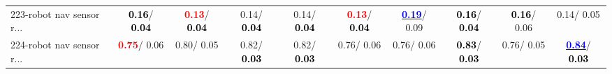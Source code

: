 \begin{table}[h]
\begin{center}
{\begin{tabular}{lc|c|c|c|c|c|c|c|c}
223-robot nav sensor r... & \textcolor{black}{\textbf{  0.16}}/\textcolor{black}{\textbf{  0.04}} & \textcolor{red}{\textbf{  0.13}}/\textcolor{black}{\textbf{  0.04}} &   0.14/\textcolor{black}{\textbf{  0.04}} &   0.14/\textcolor{black}{\textbf{  0.04}} & \textcolor{red}{\textbf{  0.13}}/\textcolor{black}{\textbf{  0.04}} & \underline{\textcolor{blue}{\textbf{  0.19}}}/  0.09 & \textcolor{black}{\textbf{  0.16}}/\textcolor{black}{\textbf{  0.04}} & \textcolor{black}{\textbf{  0.16}}/  0.06 &   0.14/  0.05 \\
224-robot nav sensor r... & \textcolor{red}{\textbf{  0.75}}/  0.06 &   0.80/  0.05 &   0.82/\textcolor{black}{\textbf{  0.03}} &   0.82/\textcolor{black}{\textbf{  0.03}} &   0.76/  0.06 &   0.76/  0.06 & \textcolor{black}{\textbf{  0.83}}/\textcolor{black}{\textbf{  0.03}} &   0.76/  0.05 & \underline{\textcolor{blue}{\textbf{  0.84}}}/\textcolor{black}{\textbf{  0.03}} \\\end{tabular}}\label{stratsALCKappa6AllRedux50a}
\end{center}
\end{table}
